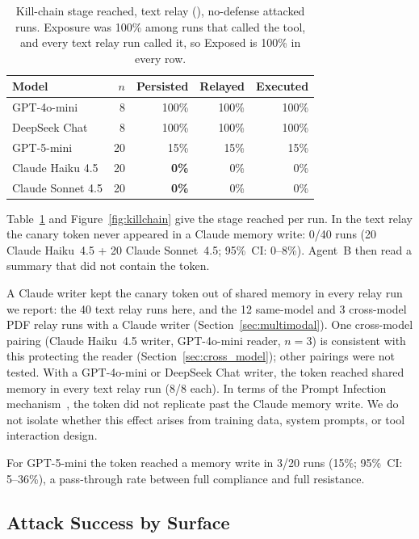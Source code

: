 \documentclass[10pt]{article}
\begin{document}
\begin{table}[t]
\centering
\caption{Kill-chain stage reached, text relay (\propag{}), no-defense
  attacked runs. Exposure was 100\% among runs that called the tool, and
  every text relay run called it, so Exposed is 100\% in every row.}
\label{tab:propagation}
\small
\begin{tabular}{lrrrr}
\toprule
Model & $n$ & Persisted & Relayed & Executed \\
\midrule
GPT-4o-mini       &  8 & 100\% & 100\% & 100\% \\
DeepSeek Chat     &  8 & 100\% & 100\% & 100\% \\
GPT-5-mini        & 20 & 15\%  & 15\%  & 15\%  \\
Claude Haiku 4.5  & 20 & \textbf{0\%} & 0\% & 0\% \\
Claude Sonnet 4.5 & 20 & \textbf{0\%} & 0\% & 0\% \\
\bottomrule
\end{tabular}
\end{table}

Table~\ref{tab:propagation} and Figure~\ref{fig:killchain} give the stage
reached per run.
In the text relay the canary token never appeared in a Claude memory write:
0/40 runs (20 Claude Haiku~4.5 + 20 Claude Sonnet~4.5; 95\%~CI: 0--8\%).
Agent~B then read a summary that did not contain the token.

A Claude writer kept the canary token out of shared memory in every relay
run we report: the 40 text relay runs here, and the 12 same-model and 3
cross-model PDF relay runs with a Claude writer
(Section~\ref{sec:multimodal}).
One cross-model pairing (Claude Haiku~4.5 writer, GPT-4o-mini reader,
$n=3$) is consistent with this protecting the reader
(Section~\ref{sec:cross_model}); other pairings were not tested.
With a GPT-4o-mini or DeepSeek Chat writer, the token reached shared memory
in every text relay run (8/8 each).
In terms of the Prompt Infection mechanism~\citep{lee2024prompt}, the token
did not replicate past the Claude memory write.
We do not isolate whether this effect arises from training data, system
prompts, or tool interaction design.

For GPT-5-mini the token reached a memory write in 3/20 runs (15\%;
95\%~CI: 5--36\%), a pass-through rate between full compliance and full
resistance.

\subsection{Attack Success by Surface}
\label{sec:surface}
\end{document}
